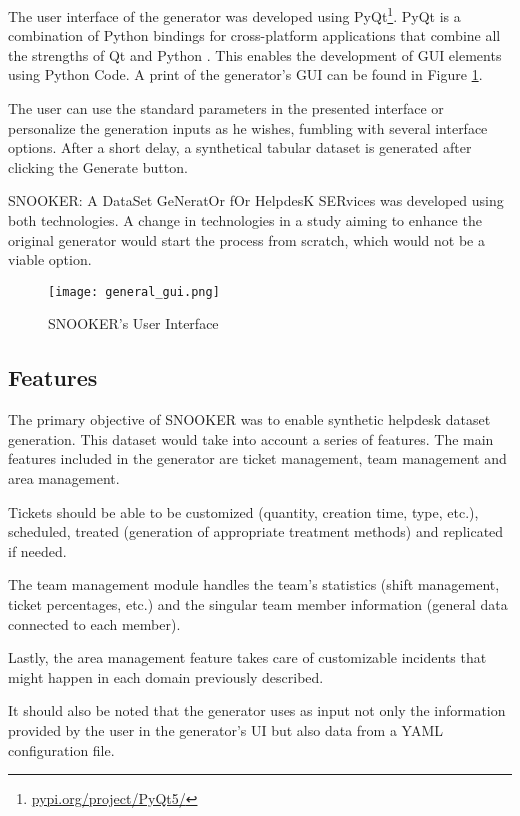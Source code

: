 The user interface of the generator was developed using PyQt\footnote{\href{https://pypi.org/project/PyQt5/}{pypi.org/project/PyQt5/}}. PyQt is a combination of Python bindings for cross-platform applications that combine all the strengths of Qt and Python \citep{siahaan2019postgresql}. This enables the development of GUI elements using Python Code. A print of the generator's GUI can be found in Figure \ref{fig:general_gui}.

The user can use the standard parameters in the presented interface or personalize the generation inputs as he wishes, fumbling with several interface options. After a short delay, a synthetical tabular dataset is generated after clicking the Generate button.

SNOOKER: A DataSet GeNeratOr fOr HelpdesK SERvices was developed using both technologies. A change in technologies in a study aiming to enhance the original generator would start the process from scratch, which would not be a viable option.

\begin{figure}[t]
  \begin{center}
    \leavevmode
    \texttt{[image: general\_gui.png]}
    \caption{SNOOKER's User Interface}
    \label{fig:general_gui}
  \end{center}
\end{figure}

\subsection{Features}
The primary objective of SNOOKER was to enable synthetic helpdesk dataset generation. This dataset would take into account a series of features. The main features included in the generator are ticket management, team management and area management.

Tickets should be able to be customized (quantity, creation time, type, etc.), scheduled, treated (generation of appropriate treatment methods) and replicated if needed. 

The team management module handles the team's statistics (shift management, ticket percentages, etc.) and the singular team member information (general data connected to each member).

Lastly, the area management feature takes care of customizable incidents that might happen in each domain previously described.

It should also be noted that the generator uses as input not only the information provided by the user in the generator's UI but also data from a YAML configuration file.

